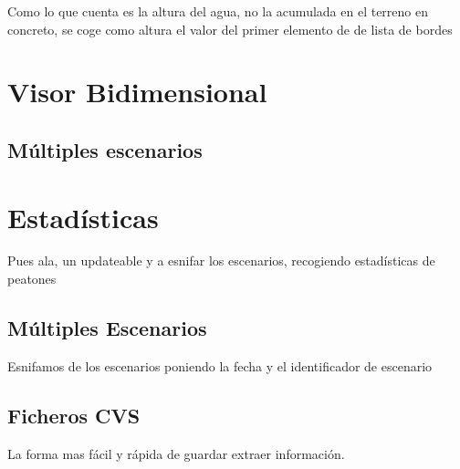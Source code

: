 Como lo que cuenta es la altura del agua, no la acumulada en el terreno en
concreto, se coge como altura el valor del primer elemento de de lista de bordes
\section*{Visor Bidimensional}
\subsection*{Múltiples escenarios}
\section*{Estadísticas}
Pues ala, un updateable y a esnifar los escenarios, recogiendo estadísticas de
peatones
\subsection*{Múltiples Escenarios}
Esnifamos de los escenarios poniendo la fecha y el identificador de escenario
\subsection*{Ficheros CVS}
La forma mas fácil y rápida de guardar extraer información.